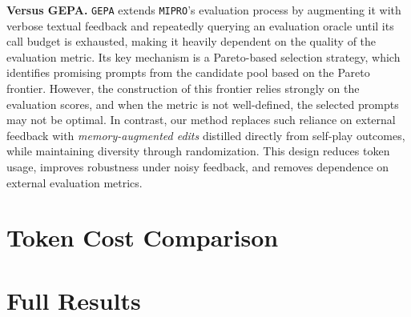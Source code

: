\textbf{Versus GEPA.} \texttt{GEPA} extends \texttt{MIPRO}'s evaluation process by augmenting it with verbose textual feedback and repeatedly querying an evaluation oracle until its call budget is exhausted, making it heavily dependent on the quality of the evaluation metric. Its key mechanism is a Pareto-based selection strategy, which identifies promising prompts from the candidate pool based on the Pareto frontier. However, the construction of this frontier relies strongly on the evaluation scores, and when the metric is not well-defined, the selected prompts may not be optimal. In contrast, our method replaces such reliance on external feedback with \emph{memory-augmented edits} distilled directly from self-play outcomes, while maintaining diversity through randomization. This design reduces token usage, improves robustness under noisy feedback, and removes dependence on external evaluation metrics.  

\section{Token Cost Comparison}
\label{appendix:token_cost}

\begin{table}[!ht]
    \centering
    \scriptsize
    \setlength{\tabcolsep}{0.1cm}
    \caption{Output token cost for each prompt optimization method (exact counts).}
    \label{tab:token-cost}
\end{table}

\section{Full Results}
\label{appendix: Full_Results}

